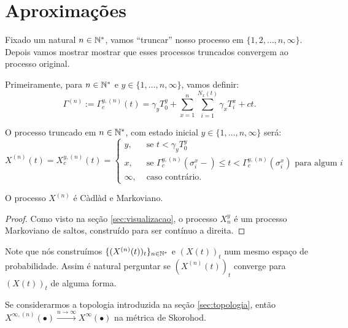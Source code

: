 
\section{Aproximações}
\label{sec:aproximacoes}

Fixado um natural $n \in {\mathbb{N^*}}$, vamos ``truncar'' nosso processo em
$\{1, 2, \ldots, n, \infty\}$. Depois vamos mostrar mostrar que esses
processos truncados convergem ao processo original.

Primeiramente, para $n \in {\mathbb{N^*}}$ e $y \in \{1, \ldots, n, \infty\}$,
vamos definir:
\begin{equation}
  \Gamma^{(n)} := \Gamma^{y,(n)}_c (t) = \gamma_y T_0^y
  + \sum_{x =1}^{n} \sum_{i = 1}^{N_x(t)}
  \gamma_x T_i^x
  + ct.
\end{equation}

O processo truncado em $n \in {\mathbb{N^*}}$, com estado inicial $y \in \{1,
\ldots, n, \infty\}$ será:
\begin{equation}
  X^{(n)}(t) = X^{y,(n)}_c(t) = \begin{cases}
    y, & \textrm{ se }  t < \gamma_y T_0^y\\
    x, & \textrm{ se } \Gamma^{y,(n)}_c(\sigma_i^x-) \leq t <
    \Gamma^{y,(n)}_c(\sigma^x_i)
    \textrm{ para algum } i \\
    \infty, & \textrm{ caso contrário.}
  \end{cases}
\end{equation}

\begin{proposicao}
  O processo $X^{(n)}$ é Càdlàd e Markoviano.
\end{proposicao}
\begin{proof}
  Como visto na seção \ref{sec:visualizacao}, o processo $X_n^y$ é um
  processo Markoviano de saltos, construído para ser contínuo a
  direita.
\end{proof}

Note que nós construímos $\{(X^{(n)}(t))_t\}_{n \in {\mathbb{N^*}}}$ e $(X(t))_t$
num mesmo espaço de probabilidade. Assim é natural perguntar se
$(X^{(n)}(t))_t$ converge para $(X(t))_t$ de alguma forma.

\begin{teorema}
  \label{teo:convergencia}
  Se considerarmos a topologia introduzida na seção
  \ref{sec:topologia}, então $X^{\infty, (n)} (\bullet) \xrightarrow{n \to
    \infty} X^\infty(\bullet)$ \qc na métrica de Skorohod.
\end{teorema}


